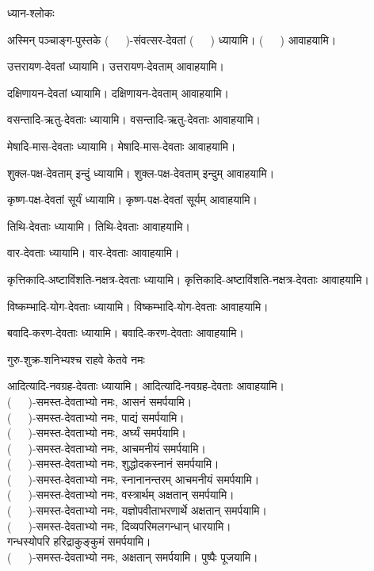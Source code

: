 










ध्यान-श्लोकः


\newcommand{\devataaM}{(~~~)}
\newcommand{\devataam}{(~~~)}
\newcommand{\devataayai}{(~~~)}
\newcommand{\devataadi}{(~~~)}
\newcommand{\yname}{(~~~)}


अस्मिन् पञ्चाङ्ग-पुस्तके \yname-संवत्सर-देवतां \devataaM{} ध्यायामि। \devataam{} आवाहयामि।

उत्तरायण-देवतां ध्यायामि। उत्तरायण-देवताम् आवाहयामि।

दक्षिणायन-देवतां ध्यायामि। दक्षिणायन-देवताम् आवाहयामि।

वसन्तादि-ऋतु-देवताः ध्यायामि। वसन्तादि-ऋतु-देवताः आवाहयामि।

मेषादि-मास-देवताः ध्यायामि। मेषादि-मास-देवताः आवाहयामि।

शुक्ल-पक्ष-देवताम् इन्दुं ध्यायामि। शुक्ल-पक्ष-देवताम् इन्दुम् आवाहयामि।

कृष्ण-पक्ष-देवतां सूर्यं ध्यायामि। कृष्ण-पक्ष-देवतां सूर्यम् आवाहयामि।

तिथि-देवताः ध्यायामि। तिथि-देवताः आवाहयामि।

वार-देवताः ध्यायामि। वार-देवताः आवाहयामि।

कृत्तिकादि-अष्टाविंशति-नक्षत्र-देवताः ध्यायामि। कृत्तिकादि-अष्टाविंशति-नक्षत्र-देवताः आवाहयामि।

विष्कम्भादि-योग-देवताः ध्यायामि। विष्कम्भादि-योग-देवताः आवाहयामि।

बवादि-करण-देवताः ध्यायामि। बवादि-करण-देवताः आवाहयामि।

{गुरु-शुक्र-शनिभ्यश्च राहवे केतवे नमः}

आदित्यादि-नवग्रह-देवताः ध्यायामि। आदित्यादि-नवग्रह-देवताः आवाहयामि।\\
\devataadi-समस्त-देवताभ्यो नमः, आसनं समर्पयामि।\\
\devataadi-समस्त-देवताभ्यो नमः, पाद्यं समर्पयामि।\\
\devataadi-समस्त-देवताभ्यो नमः, अर्घ्यं समर्पयामि।\\
\devataadi-समस्त-देवताभ्यो नमः, आचमनीयं समर्पयामि।\\
\devataadi-समस्त-देवताभ्यो नमः, शुद्धोदकस्नानं समर्पयामि।\\
\devataadi-समस्त-देवताभ्यो नमः, स्नानानन्तरम् आचमनीयं समर्पयामि।\\
\devataadi-समस्त-देवताभ्यो नमः, वस्त्रार्थम् अक्षतान् समर्पयामि।\\
\devataadi-समस्त-देवताभ्यो नमः, यज्ञोपवीताभरणार्थे अक्षतान् समर्पयामि।\\
\devataadi-समस्त-देवताभ्यो नमः, दिव्यपरिमलगन्धान् धारयामि।\\ गन्धस्योपरि हरिद्राकुङ्कुमं समर्पयामि।\\
\devataadi-समस्त-देवताभ्यो नमः, अक्षतान् समर्पयामि। पुष्पैः पूजयामि।\\

